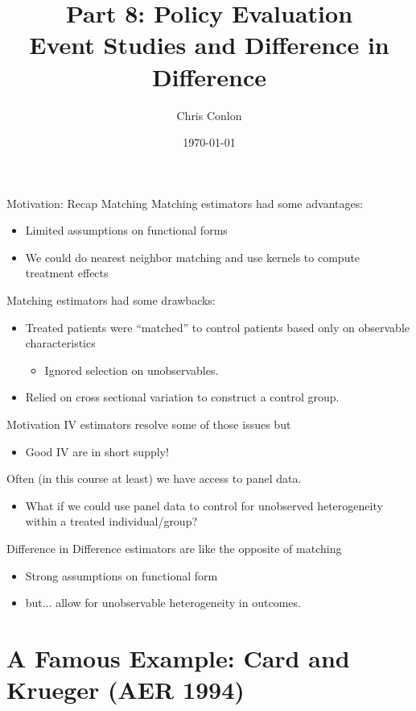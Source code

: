 \documentclass[xcolor=pdftex,dvipsnames,table,mathserif,aspectratio=169]{beamer}
\begin{document}
\title{Part 8: Policy Evaluation\\
 Event Studies and Difference in Difference}
\author{Chris Conlon}
\date{\today}

\frame{\titlepage}

\begin{frame}{Motivation: Recap Matching}
Matching estimators had some advantages:
\begin{itemize}
\item Limited assumptions on \alert{functional forms}
\item We could do nearest neighbor matching and use kernels to compute treatment effects
\end{itemize}
Matching estimators had some drawbacks:
\begin{itemize}
\item Treated patients were ``matched'' to control patients based only on \alert{observable characteristics}
\begin{itemize}
\item Ignored \alert{selection on unobservables}.
\end{itemize}
\item Relied on \alert{cross sectional} variation to construct a control group.
\end{itemize}
\end{frame}


\begin{frame}{Motivation}
IV estimators resolve some of those issues but
\begin{itemize}
\item Good IV are in short supply!
\end{itemize}
 Often (in this course at least) we have access to \alert{panel data}.
\begin{itemize}
\item What if we could use panel data to control for \alert{unobserved heterogeneity} within a treated individual/group?
\end{itemize}
\alert{Difference in Difference} estimators are like the opposite of matching
\begin{itemize}
\item \alert{Strong} assumptions on \alert{functional form}
\item but... allow for \alert{unobservable heterogeneity} in outcomes.
\end{itemize}
\end{frame}


\section{A Famous Example: Card and Krueger (AER 1994)}
\end{document}
